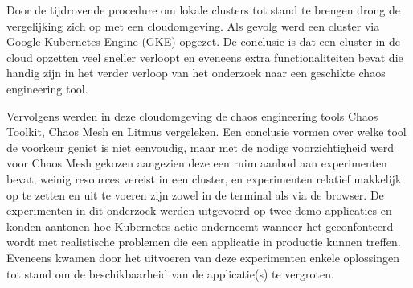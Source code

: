 Door de tijdrovende procedure om lokale clusters tot stand te brengen drong de vergelijking zich op met een cloudomgeving. Als gevolg werd een cluster via Google Kubernetes Engine (GKE) opgezet. De conclusie is dat een cluster in de cloud opzetten veel sneller verloopt en eveneens extra functionaliteiten bevat die handig zijn in het verder verloop van het onderzoek naar een geschikte chaos engineering tool.  

Vervolgens werden in deze cloudomgeving de chaos engineering tools Chaos Toolkit, Chaos Mesh en Litmus vergeleken. Een conclusie vormen over welke tool de voorkeur geniet is niet eenvoudig, maar met de nodige voorzichtigheid werd voor Chaos Mesh gekozen aangezien deze een ruim aanbod aan experimenten bevat, weinig resources vereist in een cluster, en experimenten relatief makkelijk op te zetten en uit te voeren zijn zowel in de terminal als via de browser. De experimenten in dit onderzoek werden uitgevoerd op twee demo-applicaties en konden aantonen hoe Kubernetes actie onderneemt wanneer het geconfonteerd wordt met realistische problemen die een applicatie in productie kunnen treffen. Eveneens kwamen door het uitvoeren van deze experimenten enkele oplossingen tot stand om de beschikbaarheid van de applicatie(s) te vergroten.    
